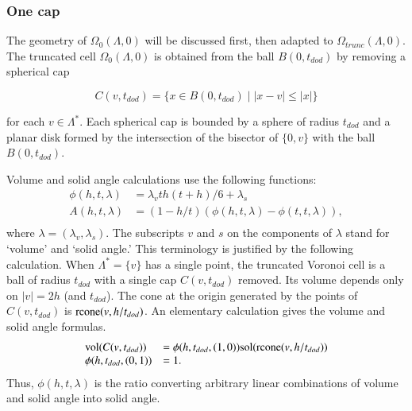 \documentclass{article} %
\begin{document}
\subsubsection{One cap}

The geometry of $\Omega_0(\Lambda,0)$ will be discussed first,
then adapted to $\Omega_{trunc}(\Lambda,0)$.  The truncated cell
$\Omega_0(\Lambda,0)$ is obtained from the ball $B(0,t_{dod})$ by
removing a spherical cap

$$
C(v,t_{dod}) = \{x \in B(0,t_{dod}) \mid  |x - v| \le |x| \}
$$

\noindent for each $v\in\Lambda^*$.
Each spherical cap is bounded by a sphere of radius $t_{dod}$ and
a planar disk formed by the intersection of the bisector of 
$\{0,v\}$ with the ball $B(0,t_{dod})$.

Volume and solid angle calculations use the following functions:
\begin{equation}
\begin{array}{lll}
\phi(h,t,\lambda) &= \lambda_v t h (t+h)/6 + \lambda_s\\
A(h,t,\lambda) &= (1-h/t)(\phi(h,t,\lambda)-\phi(t,t,\lambda)),\\
\end{array}
\end{equation}
where $\lambda=(\lambda_v,\lambda_s)$.  The subscripts $v$ and $s$
on the components of $\lambda$ stand for `volume' and `solid angle.'
This terminology is justified by the following calculation.
%
%
%
When $\Lambda^* = \{v\}$ has a single point, the truncated Voronoi
cell is a ball of radius $t_{dod}$
with a single cap $C(v,t_{dod})$ removed.  Its volume depends
only on $|v|=2h$ (and $t_{dod}$).  
The cone at the origin generated by the points of $C(v,t_{dod})$ is
${\operatorname{rcone}}(v,h/t_{dod})$.  An elementary calculation gives the volume and
solid angle formulas.
\begin{equation}  
  \begin{array}{lll}
    {\operatorname{vol}}(C(v,t_{dod})) &= \phi(h,t_{dod},(1,0)){\operatorname{sol}}({\operatorname{rcone}}(v,h/t_{dod})) \\
     \phi(h,t_{dod},(0,1))&=1.\\
  \end{array}
\end{equation}
Thus, $\phi(h,t,\lambda)$ is the ratio converting  arbitrary linear combinations of volume and solid angle into solid angle.
\end{document}
